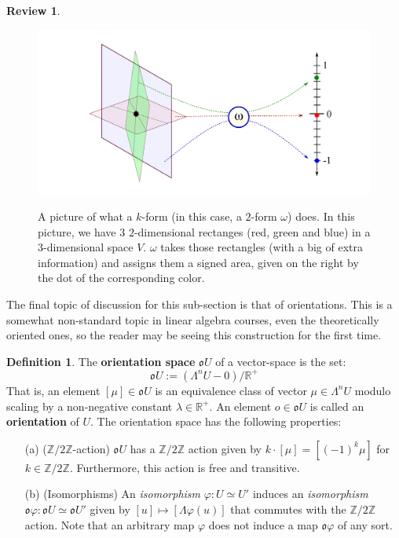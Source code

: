 \documentclass[12pt]{article}
\theoremstyle{definition}
\newtheorem{definition}[theorem]{Definition}
\newtheorem{review}[theorem]{Review}
\numberwithin{equation}{section}
\newcommand{\R}{{\mathbb R}}
\newcommand{\Z}{{\mathbb Z}}
\begin{document}
\begin{review}
\begin{figure}[h]
    \centering
    \includegraphics[width=\textwidth]{reu_figures/exterior_algebra.png}
    \label{fig:exterior_algebra}
    \caption{A picture of what a $k$-form (in this case, a $2$-form $\omega$) does. In this picture, we have 3 $2$-dimensional rectanges (red, green and blue) in a $3$-dimensional space $V$. $\omega$ takes those rectangles (with a big of extra information) and assigns them a signed area, given on the right by the dot of the corresponding color.}
\end{figure}

The final topic of discussion for this sub-section is that of orientations. This is a somewhat non-standard topic in linear algebra courses, even the theoretically oriented ones, so the reader may be seeing this construction for the first time.

\begin{definition} \label{def:orientation_space} The {\bf orientation space} $\mathfrak{o}U$ of a vector-space is the set:
\[
\mathfrak{o}U := (\Lambda^n U - 0)/\R^+
\]
That is, an element $[\mu] \in \mathfrak{o}U$ is an equivalence class of vector $\mu \in \Lambda^n U$ modulo scaling by a non-negative constant $\lambda \in \R^+$. An element $o \in \mathfrak{o}U$ is called an {\bf orientation} of $U$. The orientation space has the following properties:
\begin{enumerate}
	\item[(a)] ($\Z/2\Z$-action) $\mathfrak{o}U$ has a $\mathbb{Z}/2\Z$ action given by $k \cdot [\mu] = [(-1)^k\mu]$ for $k \in \Z/2\Z$. Furthermore, this action is free and transitive.
	\item[(b)] (Isomorphisms) An \emph{isomorphism} $\varphi:U \simeq U'$ induces an \emph{isomorphism} $\mathfrak{o}\varphi:\mathfrak{o}U \simeq \mathfrak{o}U'$ given by $[u] \mapsto [\Lambda\varphi(u)]$ that commutes with the $\Z/2\Z$ action. Note that an arbitrary map $\varphi$ does not induce a map $\mathfrak{o}\varphi$ of any sort.
\end{enumerate}
\end{definition}


\end{review}
\end{document}
